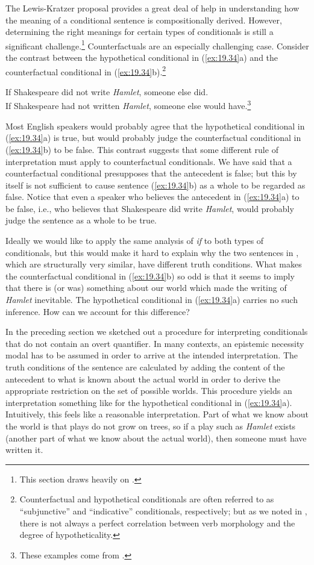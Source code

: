 The Lewis-Kratzer proposal provides a great deal of help in understanding how the meaning of a conditional sentence is compositionally derived. However, determining the right meanings for certain types of conditionals is still a significant challenge.\footnote{This section draws heavily on \citet{vonFintel2012}.} Counterfactuals are an especially challenging case. Consider the contrast between the hypothetical conditional in (\ref{ex:19.34}a) and the counterfactual conditional in (\ref{ex:19.34}b).\footnote{Counterfactual and hypothetical conditionals are often referred to as “subjunctive” and “indicative” conditionals, respectively; but as we noted in , there is not always a perfect correlation between verb morphology and the degree of hypotheticality.}


\ea \label{ex:19.34}
\ea  If Shakespeare did not write \textit{Hamlet}, someone else did.\\
\ex If Shakespeare had not written \textit{Hamlet}, someone else would have.\footnote{These examples come from \citet{Morton2004}.}
     \z
\z


Most English speakers would probably agree that the hypothetical conditional in (\ref{ex:19.34}a) is true, but would probably judge the counterfactual conditional in (\ref{ex:19.34}b) to be false. This contrast suggests that some different rule of interpretation must apply to counterfactual conditionals. We have said that a counterfactual conditional presupposes that the antecedent is false; but this by itself is not sufficient to cause sentence (\ref{ex:19.34}b) as a whole to be regarded as false. Notice that even a speaker who believes the antecedent in (\ref{ex:19.34}a) to be false, i.e., who believes that Shakespeare did write \textit{Hamlet}, would probably judge the sentence as a whole to be true.


Ideally we would like to apply the same analysis of \textit{if} to both types of conditionals, but this would make it hard to explain why the two sentences in , which are structurally very similar, have different truth conditions. What makes the counterfactual conditional in (\ref{ex:19.34}b) so odd is that it seems to imply that there is (or was) something about our world which made the writing of \textit{Hamlet} inevitable. The hypothetical conditional in (\ref{ex:19.34}a) carries no such inference. How can we account for this difference?


In the preceding section we sketched out a procedure for interpreting conditionals that do not contain an overt quantifier. In many contexts, an epistemic necessity modal has to be assumed in order to arrive at the intended interpretation. The truth conditions of the sentence are calculated by adding the content of the antecedent to what is known about the actual world in order to derive the appropriate restriction on the set of possible worlds. This procedure yields an interpretation something like  for the hypothetical conditional in (\ref{ex:19.34}a). Intuitively, this feels like a reasonable interpretation. Part of what we know about the world is that plays do not grow on trees, so if a play such as \textit{Hamlet} exists (another part of what we know about the actual world), then someone must have written it.


